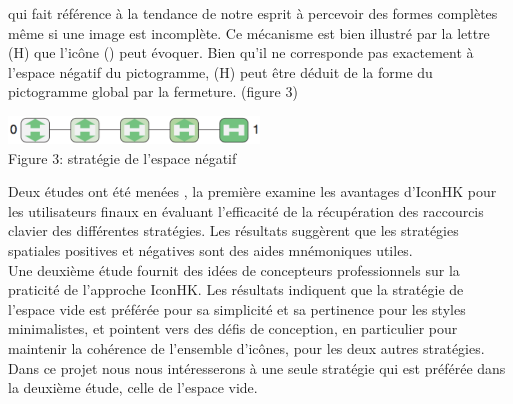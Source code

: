 \documentclass[12pt,a4paper]{article}
\newcommand\tab[1][0.65cm]{\hspace*{#1}}
\begin{document}
\begin{enumerate}
qui fait référence à la tendance de notre esprit à percevoir des formes complètes même si une image est incomplète. Ce mécanisme est bien illustré par la lettre (H) que l'icône () peut évoquer. Bien qu'il ne corresponde pas exactement à l'espace négatif du pictogramme, (H) peut être déduit de la forme du pictogramme global par la fermeture. (figure 3)
\begin{center}
	\includegraphics[width=0.5\textwidth]{T3.png}\\
	Figure 3: stratégie de l’espace négatif
\end{center}
\end{enumerate}
\tab Deux études ont été menées \cite{8}, la première examine les avantages d'IconHK pour les utilisateurs finaux en évaluant l'efficacité de la récupération des raccourcis clavier des différentes stratégies. Les résultats suggèrent que les stratégies spatiales positives et négatives sont des aides mnémoniques utiles.\\
\tab Une deuxième étude fournit des idées de concepteurs professionnels sur la praticité de l'approche IconHK. Les résultats indiquent que la stratégie de l'espace vide est préférée pour sa simplicité et sa
pertinence pour les styles minimalistes, et pointent vers des défis de conception, en particulier pour maintenir la cohérence de l'ensemble d'icônes, pour les deux autres stratégies.\\
\tab Dans ce projet nous nous intéresserons à une seule stratégie qui est préférée dans la deuxième étude,
celle de l’espace vide.
\end{document}
